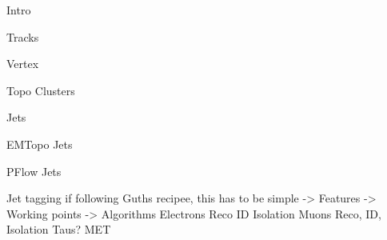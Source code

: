 Intro

Tracks

Vertex

Topo Clusters

Jets

EMTopo Jets

PFlow Jets

Jet tagging  if following Guths recipee, this has to be simple
    -> Features
    -> Working points
    -> Algorithms
Electrons
    Reco
    ID
    Isolation
Muons
    Reco, ID, Isolation
Taus?
MET